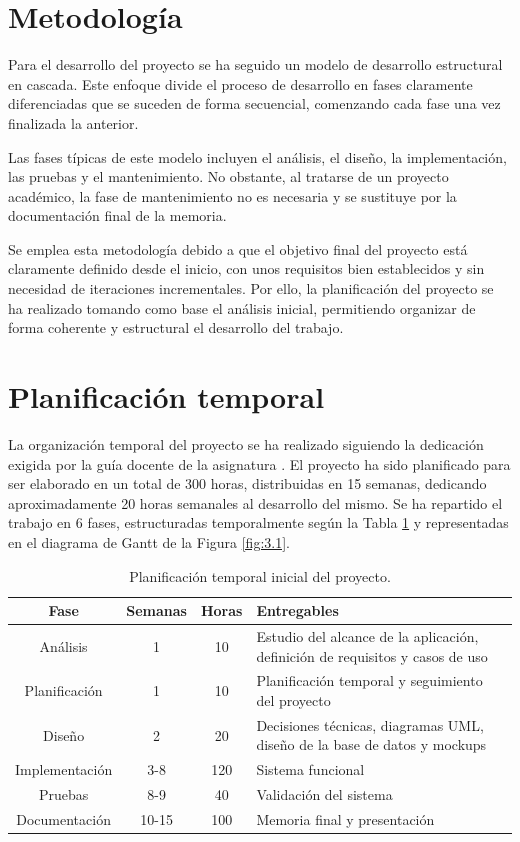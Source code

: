 \section{Metodología}
    Para el desarrollo del proyecto se ha seguido un modelo de desarrollo estructural en cascada. 
    Este enfoque divide el proceso de desarrollo en fases claramente diferenciadas que se suceden de forma secuencial, comenzando cada fase una vez finalizada la anterior. 

    Las fases típicas de este modelo incluyen el análisis, el diseño, la implementación, las pruebas y el mantenimiento. 
    No obstante, al tratarse de un proyecto académico, la fase de mantenimiento no es necesaria y se sustituye por la documentación final de la memoria.

    Se emplea esta metodología debido a que el objetivo final del proyecto está claramente definido desde el inicio, con unos requisitos bien establecidos y sin necesidad de iteraciones incrementales. 
    Por ello, la planificación del proyecto se ha realizado tomando como base el análisis inicial, permitiendo organizar de forma coherente y estructural el desarrollo del trabajo.

\section{Planificación temporal}
    La organización temporal del proyecto se ha realizado siguiendo la dedicación exigida por la guía docente de la asignatura \cite{guiadocente-tfg}.
    El proyecto ha sido planificado para ser elaborado en un total de 300 horas, distribuidas en 15 semanas, dedicando aproximadamente 20 horas semanales al desarrollo del mismo. 
    Se ha repartido el trabajo en 6 fases, estructuradas temporalmente según la Tabla \ref{tab:3.1} y representadas en el diagrama de Gantt de la Figura \ref{fig:3.1}.

    \begin{table}[H]
        \centering
        \begin{tabular}{|c c c >{\centering\arraybackslash}p{8cm}|}
        \hline
        \textbf{Fase} & \textbf{Semanas} & \textbf{Horas} & \textbf{Entregables} \\ \hline
        Análisis & 1 & 10 & Estudio del alcance de la aplicación, definición de requisitos y casos de uso\\
        Planificación & 1 & 10 & Planificación temporal y seguimiento del proyecto\\
        Diseño & 2 & 20 & Decisiones técnicas, diagramas UML, diseño de la base de datos y mockups\\
        Implementación & 3-8 & 120 & Sistema funcional\\
        Pruebas & 8-9 & 40 & Validación del sistema\\
        Documentación & 10-15 & 100 & Memoria final y presentación\\
        \hline
        \end{tabular}
        \caption{Planificación temporal inicial del proyecto.}
        \label{tab:3.1}
    \end{table}

